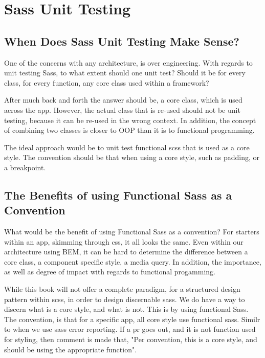 \maketitle{}
\section{ Sass Unit Testing }

\subsection{ When Does Sass Unit Testing Make Sense? }
One of the concerns with any architecture, is over engineering. With regards to
unit testing Sass, to what extent should one unit test? Should it be for every
class, for every function, any core class used within a framework?

After much back and forth the answer should be, a core class, which is used
across the app. However, the actual class that is re-used should not be unit
testing, because it can be re-used in the wrong context. In addition, the
concept of combining two classes is closer to OOP than it is to functional
programming.

The ideal approach would be to unit test functional scss that is used as a
core style. The convention should be that when using a core style, such as
padding, or a breakpoint.

\subsection{ The Benefits of using Functional Sass as a Convention }
What would be the benefit of using Functional Sass as a convention? For starters
within an app, skimming through css, it all looks the same. Even within our
architecture using BEM, it can be hard to determine the difference between a
core class, a component specific style, a media query. In addition, the
importance, as well as degree of impact with regards to functional progamming.

While this book will not offer a complete paradigm, for a structured design
pattern within scss, in order to design discernable sass. We do have a way to
discern what is a core style, and what is not. This is by using functional Sass.
The convention, is that for a specific app, all core style use functional sass.
Similr to when we use sass error reporting. If a pr goes out, and it is not
function used for styling, then comment is made that, "Per convention, this is
a core style, and should be using the appropriate function".

